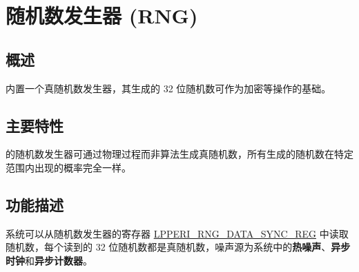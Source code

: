 \documentclass[main\_\_CN.tex]{subfiles}
\begin{document}

\ifglobal
\else
    {\let\clearpage\relax \listoftodos}
    {\let\clearpage\relax \listofdonetodos}
    \tableofcontents
\fi



\hypertarget{rng}{}
\chapter{随机数发生器 (RNG)}
\label{mod:rng}


\section{概述}

\chipname{} 内置一个真随机数发生器，其生成的 32 位随机数可作为加密等操作的基础。

\section{主要特性}

\chipname{} 的随机数发生器可通过物理过程而非算法生成真随机数，所有生成的随机数在特定范围内出现的概率完全一样。

\section{功能描述}\label{sec:rng-func-descr}

系统可以从随机数发生器的寄存器 \hyperref[regdesc:LPPERIRNGSYNCDATAREG]{LPPERI\_RNG\_DATA\_SYNC\_REG} 中读取随机数，每个读到的 32 位随机数都是真随机数，噪声源为系统中的\textbf{热噪声}、\textbf{异步时钟}和\textbf{异步计数器}。
\end{document}
